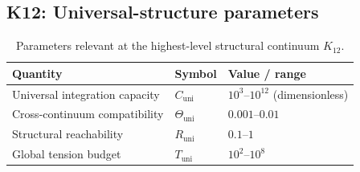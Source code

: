
\subsection*{K12: Universal-structure parameters}

\begin{table}[htbp]
  \centering
  \caption{Parameters relevant at the highest-level structural continuum \(K_{12}\).}
  \label{tab:k12-universal-parameters}
  \begin{tabular}{@{}L{0.44\textwidth}L{0.16\textwidth}L{0.23\textwidth}@{}}
    \hline
    Quantity & Symbol & Value / range \\
    \hline
    Universal integration capacity & \(C_\mathrm{uni}\)
        & \(10^3\text{–}10^{12}\) (dimensionless) \\
    Cross-continuum compatibility & \(\Theta_\mathrm{uni}\)
        & \(0.001\text{–}0.01\) \\
    Structural reachability & \(R_\mathrm{uni}\)
        & \(0.1\text{–}1\) \\
    Global tension budget & \(T_\mathrm{uni}\)
        & \(10^2\text{–}10^8\) \\
    \hline
  \end{tabular}
\end{table}

\endgroup

